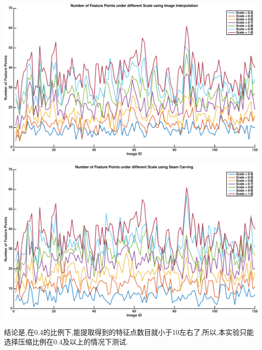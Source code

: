 \begin{center}
\begin{minipage}[t]{\linewidth}
\center
{
\captionsetup{justification=centering}
\includegraphics[width=\textwidth]{Img/c4/sift_pl} 
}
\end{minipage}
\medskip
\end{center}

\begin{center}
\begin{minipage}[t]{\linewidth}
\center
{
\captionsetup{justification=centering}
\includegraphics[width=\textwidth]{Img/c4/sift_pl_sc} 
}
\end{minipage}
\medskip
\end{center}
结论是,在0.4的比例下,能提取得到的特征点数目就小于10左右了,所以,本实验只能选择压缩比例在0.4及以上的情况下测试.\\

